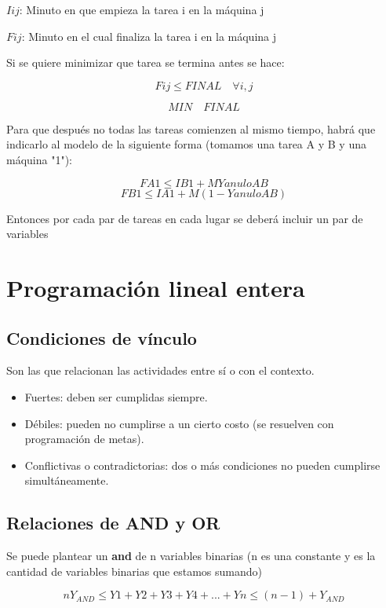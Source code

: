 \documentclass[titlepage,a4paper]{article}
\begin{document}
$Iij$: Minuto en que empieza la tarea i en la máquina j

$Fij$: Minuto en el cual finaliza la tarea i en la máquina j

Si se quiere minimizar que tarea se termina antes se hace:

$$ Fij \leq FINAL \quad \forall i, j $$

$$ MIN \quad FINAL $$

Para que después no todas las tareas comienzen al mismo tiempo, habrá que indicarlo al modelo de la siguiente forma (tomamos una tarea A y B y una máquina "1"):

$$ FA1 \leq IB1 + M YanuloAB $$
$$ FB1 \leq IA1 + M (1 - YanuloAB) $$

Entonces por cada par de tareas en cada lugar se deberá incluir un par de variables





\newpage
\section{Programación lineal entera}

\subsection{Condiciones de vínculo}

Son las que relacionan las actividades entre sí o con el contexto.

\begin{itemize}
    \item Fuertes: deben ser cumplidas siempre.
    \item Débiles: pueden no cumplirse a un cierto costo (se resuelven con programación de metas).
    \item Conflictivas o contradictorias: dos o más condiciones no pueden cumplirse simultáneamente.
\end{itemize}

\vspace{0.5cm}


\subsection{Relaciones de AND y OR}

Se puede plantear un \textbf{and} de n variables binarias (n es una constante y es la cantidad de variables binarias que estamos sumando)

$$
n Y_{AND} \leq Y1 + Y2 + Y3 + Y4 + ... + Yn \leq (n - 1) + Y_{AND}
$$
\end{document}

